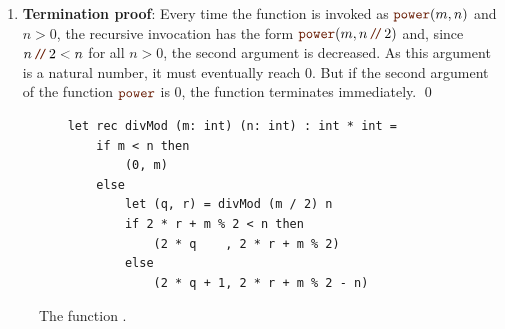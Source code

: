 \begin{enumerate}
\begin{enumerate}
            Then there exists a number $k \in \mathbb{N}$ such that $n = 2 \cdot k + 1$ and we have
            $n \dv 2 = k$.  In this case we have:
            \\[0.2cm]
            \hspace*{1.3cm}
            $ 
            \begin{array}{lcl}
            \mytt{power}(m,n) & = & \mytt{power}(m,k) \cdot \mytt{power}(m,k) \cdot m  \\[0.2cm]
                                & \stackrel{\mathrm{IV}}{=} & m^k \cdot m^k \cdot m  \\[0.2cm]
                                & = & m^{2\cdot k+1} \\[0.2cm]
                                & = & m^{n}.
            \end{array}
            $
      \end{enumerate}
      As we have shown that $\mytt{power}(m,n) = m^n$ in both cases, the induction step is finished. \mycheck
\item \textbf{Termination proof}:
      Every time the function  is invoked as $\mytt{power}(m, n)$ and $n > 0$, the recursive
      invocation has the form $\mytt{power}(m,n \dv 2)$ and, since $n \dv 2 < n$ for all $n > 0$, the second
      argument is decreased.  As this argument is a natural number, it must eventually reach $0$.  But if the
      second argument of the function $\mytt{power}$ is $0$, the function terminates immediately. \mycheck
      \qed
\end{enumerate}

\begin{figure}[!h]
  \centering
\begin{verbatim}
    let rec divMod (m: int) (n: int) : int * int =
        if m < n then
            (0, m)
        else
            let (q, r) = divMod (m / 2) n
            if 2 * r + m % 2 < n then
                (2 * q    , 2 * r + m % 2)
            else
                (2 * q + 1, 2 * r + m % 2 - n)
\end{verbatim}
\vspace*{-0.3cm}
  \caption{The function .}
  \label{fig:div_mod}
\end{figure} 


